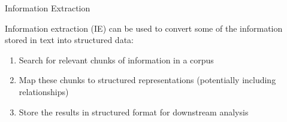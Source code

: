 \documentclass[10pt]{beamer}
\begin{document}
\begin{frame}{Information Extraction}

Information extraction (IE) can be used to convert some of the information stored in text into \alert{structured data}:

\begin{enumerate}
   \item Search for relevant chunks of information in a corpus
   \item Map these chunks to structured representations (potentially including relationships)
   \item Store the results in structured format for downstream analysis
\end{enumerate}

\begin{center}
\end{center}

\end{frame}
\end{document}
